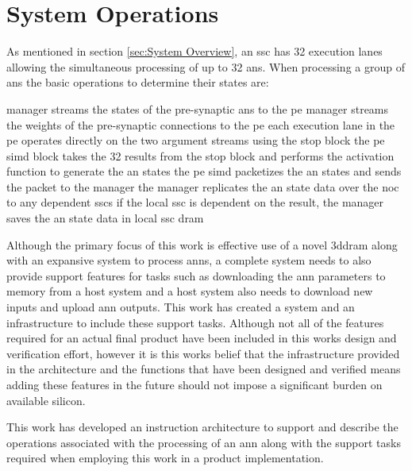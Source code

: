 

\chapter{System Operations}
\label{sec:System Operations}

As mentioned in section \ref{sec:System Overview}, an \ac{ssc} has 32 execution lanes allowing the simultaneous processing of up to 32 \acp{an}.
When processing a group of \acp{an} the basic operations to determine their states are:
\begin{outline}
  \lbbcleanspace
  \1 manager streams the states of the pre-synaptic \acp{an} to the \ac{pe}
  \1 manager streams the weights of the pre-synaptic connections to the \ac{pe}
  \1 each execution lane in the \ac{pe} operates directly on the two argument streams using the \ac{stop} block
  \1 the \ac{pe} \ac{simd} block takes the 32 results from the \ac{stop} block and performs the activation function to generate the \ac{an} states
  \1 the \ac{pe} \ac{simd} packetizes the \ac{an} states and sends the packet to the manager
  \1 the manager replicates the \ac{an} state data over the \ac{noc} to any dependent \acp{ssc}
  \1 if the local \ac{ssc} is dependent on the result, the manager saves the \ac{an} state data in local \ac{ssc} \ac{dram}
\end{outline}

Although the primary focus of this work is effective use of a novel \ac{3ddram} along with an expansive system to process \acp{ann}, a complete system needs to also provide support features for tasks such as downloading the \ac{ann} parameters to memory from a host system and a host system also needs to download new inputs and upload \ac{ann} outputs.
This work has created a system and an infrastructure to include these support tasks.
Although not all of the features required for an actual final product have been included in this works design and verification effort, however it is this works belief that the infrastructure provided in the architecture and the functions that have been designed and verified means adding these features in the future should not impose a significant burden on available silicon.

This work has developed an instruction architecture to support and describe the operations associated with the processing of an \ac{ann} along with the support tasks required when employing this work in a product implementation.

\iffalse


